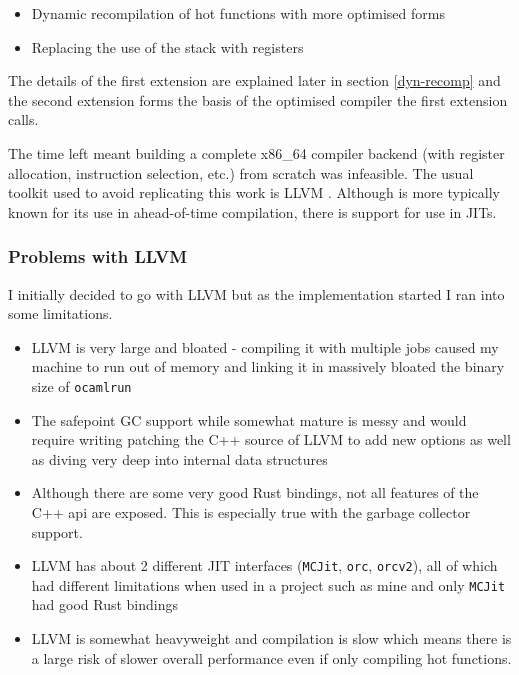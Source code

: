 \begin{itemize}
      \item Dynamic recompilation of hot functions with more optimised forms
      \item Replacing the use of the stack with registers
\end{itemize}

The details of the first extension are explained later in section \ref{dyn-recomp} and the second
extension forms the basis of the optimised compiler the first extension calls.

The time left meant building a complete x86\_64 compiler backend (with register allocation,
instruction selection, etc.) from scratch was infeasible. The usual toolkit used to avoid
replicating this work is LLVM \cite{llvm}. Although is more typically known for its use in
ahead-of-time compilation, there is support for use in JITs.

\subsubsection{Problems with LLVM}

I initially decided to go with LLVM but as the implementation started I ran into some limitations.

\begin{itemize}
      \item LLVM is very large and bloated - compiling it with multiple jobs caused my machine to
            run out of memory and linking it in massively bloated the binary size of
            \texttt{ocamlrun}
      \item The safepoint GC support while somewhat mature is messy and would require writing
            patching the C++ source of LLVM to add new options as well as diving very deep into
            internal data
            structures
      \item Although there are some very good Rust bindings, not all features of the C++ api are
            exposed. This is especially true with the garbage collector support.
      \item LLVM has about 2 different JIT interfaces (\texttt{MCJit}, \texttt{orc},
            \texttt{orcv2}),
            all of which had different limitations when used in a project such as mine and only
            \texttt{MCJit} had good Rust bindings
      \item LLVM is somewhat heavyweight and compilation is slow which means there is a large risk
            of slower overall performance even if only compiling hot functions.
\end{itemize}

